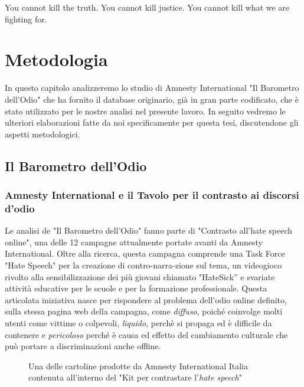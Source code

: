 \begin{savequote}[75mm]
	You cannot kill the truth. You cannot kill justice. You cannot kill what we are fighting for.
\end{savequote}

\chapter{Metodologia}
\label{chap:metodologia}

In questo capitolo analizzeremo lo studio di Amnesty International "Il Barometro dell'Odio" che ha fornito il database originario, già in gran parte codificato, che è stato utilizzato per le nostre analisi nel presente lavoro. In seguito vedremo le ulteriori elaborazioni fatte da noi specificamente per questa tesi, discutendone gli aspetti metodologici.

\section{Il Barometro dell'Odio}

\subsection{Amnesty International e il Tavolo per il contrasto ai discorsi d’odio}
Le analisi de "Il Barometro dell'Odio"  fanno parte di "Contrasto all’hate speech online", una delle 12 campagne attualmente portate avanti da Amnesty International. Oltre alla ricerca, questa campagna comprende una Task Force "Hate Speech" per la creazione di contro-narra-zione sul tema, un videogioco rivolto alla sensibilizzazione dei più giovani chiamato "HateSick” e svariate attività educative per le scuole e per la formazione professionale. Questa articolata iniziativa nasce per rispondere al problema dell'odio online definito, sulla stessa pagina web della campagna, come \textit{diffuso}, poiché coinvolge molti utenti come vittime o colpevoli, \textit{liquido}, perchè si propaga ed è difficile da contenere e \textit{pericoloso} perché è causa ed effetto del cambiamento culturale che può portare a discriminazioni anche offline.
\begin{figure}
	\caption{Una delle cartoline prodotte da Amnesty International Italia contenuta all'interno del "Kit per contrastare l'\textit{hate speech}"}
	\label{3}
\end{figure}

